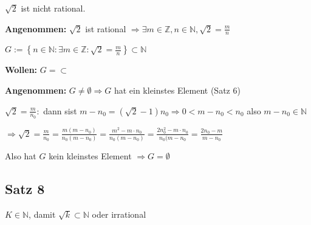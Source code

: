 \documentclass[fleqn]{scrbook}
\newcommand{\N}{\mathbb{N}}
\begin{document}
$\sqrt{2}$ ist nicht rational.

\textbf{Angenommen:} $\sqrt{2}$ ist rational $\Longrightarrow \exists m \in \mathbb{Z}, n \in \N, \sqrt{2}=\frac{m}{n}$

$G:=\left\{ n \in \N: \exists m \in \mathbb{Z}: \sqrt{2} = \frac{m}{n} \right\} \subset \N$

\textbf{Wollen:} $G=\subset$

\textbf{Angenommen:} $G \neq \emptyset \Longrightarrow G$ hat ein kleinstes Element (Satz 6)

$\sqrt{2}=\frac{m}{n_0}:$ dann sist $m-n_0 = (\sqrt{2}-1)n_0 \Longrightarrow 0<m-n_0<n_0$ also $m-n_0 \in \N$

$\Longrightarrow \sqrt{2} = \frac{m}{n_0} = \frac{m(m-n_0)}{n_0(m-n_0)} = \frac{m^2-m \cdot n_0}{n_0(m-n_0)} = \frac{2n_0^2-m \cdot n_0}{n_0(m-n_0} = \frac{2n_0-m}{m-n_0}$

Also hat $G$ kein kleinstes Element $\Longrightarrow G = \emptyset$ 

\subsection{Satz 8}

$K \in \N$, damit $\sqrt{k} \subset \N$ oder irrational
\end{document}
